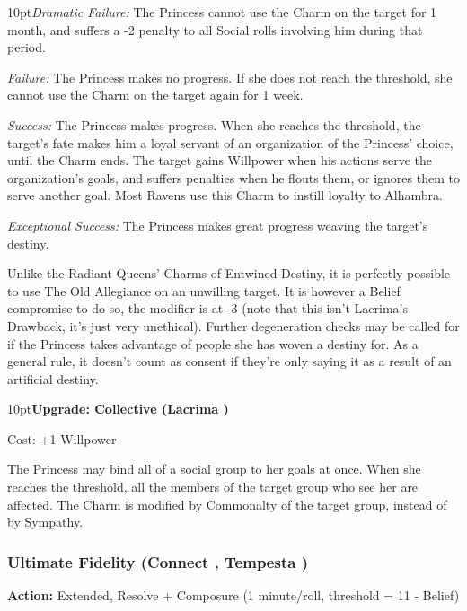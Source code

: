 \begin{myindentpar}{10pt}\emph{Dramatic Failure:} The Princess cannot use the Charm on the target for 1 month, and suffers a -2 penalty to all Social rolls involving him during that period.

\emph{Failure:} The Princess makes no progress. If she does not reach the threshold, she cannot use the Charm on the target again for 1 week.

\emph{Success:} The Princess makes progress. When she reaches the threshold, the target's fate makes him a loyal servant of an organization of the Princess' choice, until the Charm ends. The target gains Willpower when his actions serve the organization's goals, and suffers penalties when he flouts them, or ignores them to serve another goal. Most Ravens use this Charm to instill loyalty to Alhambra. 

\emph{Exceptional Success:} The Princess makes great progress weaving the target's destiny.\end{myindentpar}

\noindent Unlike the Radiant Queens' Charms of Entwined Destiny, it is perfectly possible to use The Old Allegiance on an unwilling target. It is however a Belief compromise to do so, the modifier is at -3 (note that this isn't Lacrima's Drawback, it's just very unethical). Further degeneration checks may be called for if the Princess takes advantage of people she has woven a destiny for. As a general rule, it doesn't count as consent if they're only saying it as a result of an artificial destiny.

\begin{myindentpar}{10pt}\textbf{Upgrade: Collective (Lacrima \textbullet\textbullet\textbullet\textbullet)}

Cost: +1 Willpower

The Princess may bind all of a social group to her goals at once. When she reaches the threshold, all the members of the target group who see her are affected. The Charm is modified by Commonalty of the target group, instead of by Sympathy.\end{myindentpar}

\subsubsection*{Ultimate Fidelity (Connect \textbullet\textbullet\textbullet\textbullet, Tempesta \textbullet\textbullet\textbullet)}

\noindent \textbf{Action:} Extended, Resolve + Composure (1 minute/roll, threshold = 11 - Belief)

